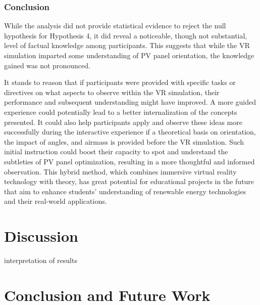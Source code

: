 \documentclass[draft, final]{vutinfth} %
\begin{document}
\subsection{Conclusion}
While the analysis did not provide statistical evidence to reject the null hypothesis for Hypothesis 4, it did reveal a noticeable, though not substantial, level of factual knowledge among participants. This suggests that while the VR simulation imparted some understanding of PV panel orientation, the knowledge gained was not pronounced.

It stands to reason that if participants were provided with specific tasks or directives on what aspects to observe within the VR simulation, their performance and subsequent understanding might have improved. A more guided experience could potentially lead to a better internalization of the concepts presented. It could also help participants apply and observe these ideas more successfully during the interactive experience if a theoretical basis on orientation, the impact of angles, and airmass is provided before the VR simulation. Such initial instruction could boost their capacity to spot and understand the subtleties of PV panel optimization, resulting in a more thoughtful and informed observation. This hybrid method, which combines immersive virtual reality technology with theory, has great potential for educational projects in the future that aim to enhance students' understanding of renewable energy technologies and their real-world applications.

\chapter{Discussion}
interpretation of results

\chapter{Conclusion and Future Work}

\backmatter

\listoffigures %



\printindex

\printglossaries


% 

\end{document}
